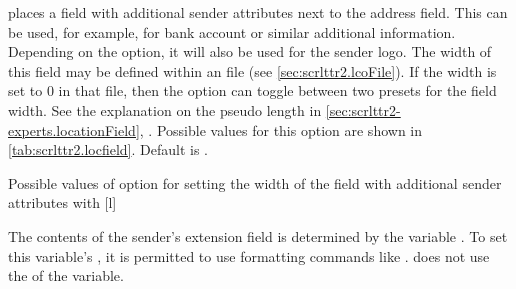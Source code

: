 \begin{Declaration}
\end{Declaration}
%
 places a field with additional sender attributes next to the
address field. This can be used, for example, for bank account
or similar additional information.
Depending on the
 option, it will also be used for the sender
logo. The width of this field may be defined within an  file
(see \autoref{sec:scrlttr2.lcoFile}). If the width is set to 0 in that file,
then the  option can toggle between two presets for
the field width. See the explanation on the  pseudo
length in \autoref{sec:scrlttr2-experts.locationField},
. Possible values for this
option are shown in \autoref{tab:scrlttr2.locfield}. Default is
.%
%
\begin{table}
  \setcapindent{0pt}%
  \begin{captionbeside}
    {Possible values of option  for
      setting the width of the field with additional sender attributes with
      \label{tab:scrlttr2.locfield}}%
    [l]
    \begin{minipage}[t]{.45\linewidth}
      \begin{desctabular}[t]
      \end{desctabular}
    \end{minipage}
  \end{captionbeside}
\end{table}

\begin{Declaration}
\end{Declaration}
%
The contents of the sender's extension field is determined by the
variable . To set this variable's , it is
permitted to use formatting commands like . \KOMAScript{}
does not use the  of the variable.

